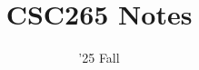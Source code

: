 \documentclass[11pt]{scrartcl}
\begin{document}
\title{CSC265 Notes}
\date{'25 Fall} %
\maketitle

\setcounter{tocdepth}{1}
\tableofcontents
\newpage

 \newpage
 \newpage
 \newpage
 \newpage
 \newpage
 \newpage
 \newpage
 \newpage
 \newpage
 \newpage

\end{document}
